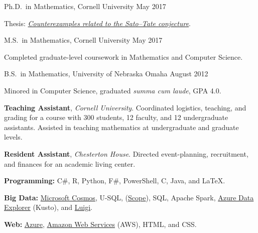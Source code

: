 \documentclass[11pt, letterpaper]{awesome-cv}
\begin{document}

\begin{cventries}

\cventry
	{Ph.D.~in Mathematics, Cornell University}
	{}{}
	{May 2017}
	{
		\begin{cvitems}
			\item{Thesis: \href{http://doi.org/10.7298/X4PN93Q3}{\emph{Counterexamples related to the Sato--Tate conjecture}}.}
		\end{cvitems}
	}
	
\cventry
	{M.S.~in Mathematics, Cornell University}
	{}{}
	{May 2017}
	{
		\begin{cvitems}
			\item{Completed graduate-level coursework in Mathematics and Computer Science.}
		\end{cvitems}
	}
	
\cventry
	{B.S.~in Mathematics, University of Nebraska Omaha}
	{}{}
	{August 2012}
	{
		\begin{cvitems}
			\item{Minored in Computer Science, graduated \emph{summa cum laude}, GPA 4.0.}
		\end{cvitems}
	}
	
\end{cventries}






\begin{cvparagraph}
\textbf{Teaching Assistant}, \emph{Cornell University}. Coordinated logistics, teaching, and grading for a course with 300 students, 12 faculty, and 12 undergraduate assistants.
Assisted in teaching mathematics at undergraduate and graduate levels.

\textbf{Resident Assistant}, \emph{Chesterton House}. Directed event-planning, recruitment, and finances for an academic living center. 
\end{cvparagraph}






\begin{cvparagraph}
\textbf{Programming:} C\#, R, Python, F\#, PowerShell, C, Java, and \LaTeX.

\textbf{Big Data:}
\href{https://docs.microsoft.com/en-us/azure/cosmos-db/introduction}{Microsoft Cosmos}, 
U-SQL, 
(\href{https://doi.org/10.14778/1454159.1454166}{Scope}),
SQL,
Apache Spark,
\href{https://docs.microsoft.com/en-us/azure/kusto/query/index}{Azure Data Explorer} (Kusto),
and 
\href{https://github.com/spotify/luigi}{Luigi}.

\textbf{Web:} 
\href{https://azure.microsoft.com/}{Azure}, 
\href{https://aws.amazon.com/}{Amazon Web Services} (AWS), 
HTML, and CSS.
\end{cvparagraph}
\end{document}
